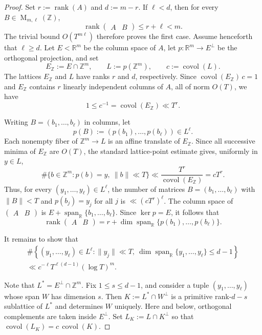 \documentclass[reqno,11pt]{amsart}
\numberwithin{equation}{section}
\theoremstyle{definition}
\theoremstyle{remark}
\newcommand{\op}{\operatorname}
\newcommand{\rank}{\op{rank}}
\newcommand{\M}{\op{M}}
\newcommand{\covol}{\op{covol}}
\begin{document}
\begin{proof}
Set
$
r:=\rank(A)
$
and
$
d:=m-r.
$
If $\ell<d$, then for every $B\in\M_{m,\ell}(\mathbb Z)$,
$$
\rank\begin{pmatrix}A&B\end{pmatrix}
\le r+\ell<m.
$$
 The trivial bound
$O(T^{m\ell})$ therefore proves the first case. Assume henceforth that
$\ell\ge d$. Let $E<\mathbb R^m$ be the column space of $A$, let
$p:\mathbb R^m\to E^\perp$ be the orthogonal projection, and set
$$
E_{\mathbb Z}:=E\cap\mathbb Z^m,
\qquad
L:=p(\mathbb Z^m),
\qquad
c:=\covol(L).
$$
The lattices $E_{\mathbb Z}$ and $L$ have ranks $r$ and $d$,
respectively. Since
$
\covol(E_{\mathbb Z})\,c=1
$
and $E_{\mathbb Z}$ contains $r$ linearly independent columns of
$A$, all of norm $O(T)$, we have
$$
1\le c^{-1}=\covol(E_{\mathbb Z})\ll T^r.
$$

Writing $B=(b_1,\ldots,b_\ell)$ in columns, let
$$
p(B):=(p(b_1),\ldots,p(b_\ell))\in L^\ell.
$$
Each nonempty fiber of $\mathbb Z^m\to L$ is an affine translate of
$E_{\mathbb Z}$. Since all successive minima of $E_{\mathbb Z}$ are
$O(T)$, the standard lattice-point estimate gives, uniformly in $y\in L$,
$$
\#\{b\in\mathbb Z^m:p(b)=y,\ \|b\|\ll T\}
\ll
\frac{T^r}{\covol(E_{\mathbb Z})}
=cT^r.
$$
Thus, for every $(y_1,\ldots,y_\ell)\in L^\ell$, the number of matrices
$B=(b_1,\ldots,b_\ell)$ with $\|B\|<T$ and
$p(b_j)=y_j$ for all $j$ is $\ll(cT^r)^\ell$.
The column space of $\begin{pmatrix}A&B\end{pmatrix}$ is
$
E+\operatorname{span}_{\mathbb R}\{b_1,\ldots,b_\ell\}.
$
Since $\ker p=E$, it follows that
$$
\rank\begin{pmatrix}A&B\end{pmatrix}
=
r+\dim\operatorname{span}_{\mathbb R}
\{p(b_1),\ldots,p(b_\ell)\}.
$$

It remains to show that
\begin{multline}\label{eq:projected-rank-bound}
\#\left\{
(y_1,\ldots,y_\ell)\in L^\ell:
\|y_j\|\ll T,\
\dim\operatorname{span}_{\mathbb R}\{y_1,\ldots,y_\ell\}\le d-1
\right\} \\
\ll
c^{-\ell}T^{\ell(d-1)}(\log T)^m.
\end{multline}

Note that
$L^*=E^\perp\cap\mathbb Z^m$.
Fix $1\le s\le d-1$, and consider a tuple
$(y_1,\ldots,y_\ell)$ whose span $W$ has dimension $s$. Then
$K:=L^*\cap W^\perp$
is a primitive rank-$d-s$ sublattice of $L^*$ and determines $W$
uniquely. Here and below, orthogonal complements are taken inside
$E^\perp$. Set
$
L_K:=L\cap K^\perp
$
so that
$\covol(L_K)=c\,\covol(K)$.


\end{proof}
\end{document}
